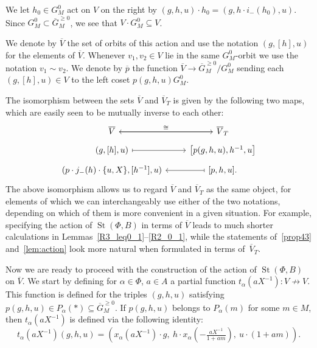 \documentclass[10pt,a4paper,twoside]{article}
\theoremstyle{remark}
\theoremstyle{definition}
\numberwithin{lemma}{section}
\numberwithin{prop}{section}
\numberwithin{corollary}{section}
\numberwithin{externaltheorem}{section}
\DeclareMathOperator{\St}{St}
\numberwithin{equation}{section}
\begin{document}
We let $h_0 \in G_M^0$ act on $V$ on the right by $(g, h, u) \cdot h_0 = (g, h \cdot i_-(h_0), u)$. Since $G^0_M \subset \overline{G}^{\geq 0}_M$, we see that $V \cdot G_M^0 \subseteq V$.

We denote by $\overline{V}$ the set of orbits of this action and use the notation $(g, [h], u)$ for the elements of $\overline{V}$.
Whenever $v_1, v_2 \in V$ lie in the same $G_M^0$-orbit we use the notation $v_1 \sim v_2$.
We denote by $\overline{p}$ the function $\overline{V} \to \overline{G}^{\geq 0}_M/G_M^0$ sending each $(g, [h], u) \in V$ to the left coset $p(g, h, u)G_M^0$.

The isomorphism between the sets $\overline{V}$ and $\overline{V}_T$ is given by the following two maps, which are easily seen to be mutually inverse to each other:
\begin{equation} \label{eq:VVT} \begin{tikzcd}[row sep=tiny] \overline{V} \arrow{r}{\cong} & \arrow{l} \overline{V}_T \\ (g, [h], u) \arrow[r, mapsto] & \left[p(g, h, u), h^{-1}, u\right] \\ (p \cdot j_-(h) \cdot \{u, X\}, [h^{-1}], u) & \arrow[l, mapsto] [p, h, u]. \end{tikzcd} \end{equation}
The above isomorphism allows us to regard $\overline{V}$ and $\overline{V}_T$ as the same object, for elements of which we can interchangeably use either of the two notations,
 depending on which of them is more convenient in a given situation.
For example, specifying the action of $\St(\Phi, B)$ in terms of $\overline{V}$ leads to much shorter calculations in Lemmas~\ref{R3_leq0_1}--\ref{R2_0_1},
 while the statements of~\cref{prop43} and~\cref{lem:action} look more natural when formulated in terms of~$\overline{V}_T$.

Now we are ready to proceed with the construction of the action of $\St(\Phi, B)$ on $\overline{V}$. We start by defining for $\alpha \in \Phi$, $a \in A$ a partial function $t_\alpha(aX^{-1}) \colon V \not\to V$.
This function is defined for the triples $(g, h, u)$ satisfying $p(g, h, u) \in P_\alpha(*) \subseteq \overline{G}_M^{\geq 0}$.
If $p(g, h, u)$ belongs to $P_\alpha(m)$ for some $m \in M$, then $t_\alpha(aX^{-1})$ is defined via the following identity:
\begin{equation} \label{T_1} t_\alpha(aX^{-1}) (g, h, u) = \left( x_\alpha(aX^{-1})\cdot g ,\ h \cdot x_\alpha\left(-\tfrac{aX^{-1}}{1 + am}\right),\ u \cdot (1 + am)\right).\end{equation}
\end{document}
